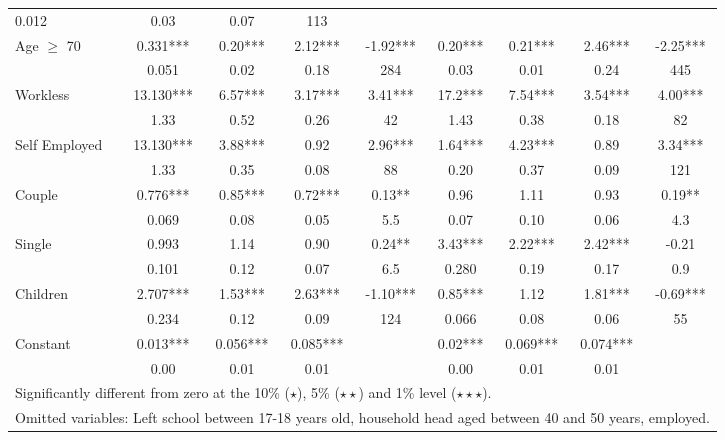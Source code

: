 \begin{table}
\begin{tabular}{l|cccc|cccc}
			    0.012   	&	0.03	&	0.07	&	113	\\
Age $\geq$ 70	&	       0.331***	&	       0.20***	&	       2.12***	&	-1.92***	&	       					0.20***	&	       0.21***	&	       2.46***	&	-2.25***	\\
                    	&	       0.051   	&	0.02	&	0.18	&	284	&	       0.03   	&	0.01	&	0.24	&	445	\\
Workless	&	       13.130***	&	       6.57***	&	       3.17***	&	3.41***	&	       						17.2***	&	       7.54***	&	       3.54***	&	4.00***	\\
	&	1.33	&	0.52	&	0.26	&	42	&	
	1.43	&	0.38	&	0.18	& 	82 \\
Self Employed	&	       13.130***	&	       3.88***	&	       0.92 &	2.96***	&	       							1.64***	&	       4.23***	&	       0.89 &	3.34***	\\
	&	1.33	&	0.35	&	0.08	&	88	&
		0.20	&	0.37	&	0.09		& 121	\\
Couple	&	      0.776***	&	       0.85***	&	      0.72***	&	0.13**	&	       						0.96	&	      1.11	&	      0.93	&	0.19**	\\
			&	0.069	&	0.08	&	0.05	&	5.5	&
			0.07	&	0.10	&	0.06		&4.3	\\
Single	&	     0.993	&	       1.14	&	      0.90	&	0.24**	&
		       3.43***	&	       2.22***	&	       2.42***	&	-0.21	\\
	&	0.101	&	0.12	&	0.07	&	6.5	&
		0.280	&	0.19	&	0.17		& 0.9	\\
Children	&	      2.707***	&	       1.53***	&	       2.63***	&	-1.10***	&	       					0.85***	&	       1.12	&	       1.81***	&	-0.69***	\\
	&	0.234	&	0.12	&	0.09	&	124	&	
		0.066	&	0.08	&	0.06		& 55	\\
Constant            	&	       0.013***	&	       0.056***	&	       0.085***	&		&	      					 0.02***	&	       0.069***	&	       0.074***	&		\\
                    	&	       0.00   	&	0.01	&	0.01	&		
		&	       0.00   	&	0.01	&	0.01	&		\\
\hline\hline
\multicolumn{9}{l}{Significantly different from zero at the  10\% ($\star$), 5\% ($\star\star$) and 1\% level ($\star\star\star$).} \\
\multicolumn{9}{l}{Omitted variables: Left school between 17-18 years old, household head aged between 40 and 50 years, employed. }
\end{tabular}
\label{table:multinom_incon}
\end{table}


